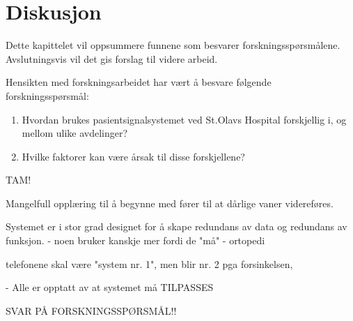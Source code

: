 \chapter{Diskusjon}
\label{chp:diskusjon_rq}

Dette kapittelet vil oppsummere funnene som besvarer forskningsspørsmålene. Avslutningsvis vil det gis forslag til videre arbeid.


\noindent
Hensikten med forskningsarbeidet har vært å besvare følgende forskningsspørsmål:

\begin{enumerate}
\item Hvordan brukes pasientsignalsystemet ved St.Olavs Hospital forskjellig i, og mellom ulike avdelinger? 
\item Hvilke faktorer kan være årsak til disse forskjellene?
\end{enumerate}






TAM!

Mangelfull opplæring til å begynne med fører til at dårlige vaner videreføres.

Systemet er i stor grad designet for å skape redundans av data og redundans av funksjon.
- noen bruker kanskje mer fordi de "må" - ortopedi	

telefonene skal være "system nr. 1", men blir nr. 2 pga forsinkelsen,

- Alle er opptatt av at systemet må TILPASSES

SVAR PÅ FORSKNINGSSPØRSMÅL!!
